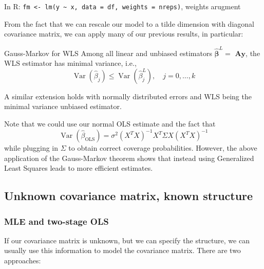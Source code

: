 \documentclass[11pt, %
	oneside, %
	english, %
	onehalfspacing, %
	]{article} %
\numberwithin{equation}{section}
\begin{document}
 In R: \lstinline|fm <- lm(y ~ x, data = df, weights = nreps)|, weights arugment

 From the fact that we can rescale our model to a tilde dimension with diagonal covariance matrix, we can apply many of our previous results, in particular:

\begin{proposition}{Gauss-Markov for WLS}{}
    Among all linear and unbiased estimators $\hat{\mathbf{\beta}}^L=$ $\mathbf{A} \mathbf{y}$, the WLS estimator has minimal variance, i.e.,
    $$
    \operatorname{Var}\left(\hat{\beta}_j\right) \leq \operatorname{Var}\left(\hat{\beta}_j^L\right), \quad j=0, \ldots, k
    $$
\end{proposition}

A similar extension holds with normally distributed errors and WLS being the minimal variance unbiased estimator.

Note that we could use our normal OLS estimate and the fact that
$$
\operatorname{Var}(\hat{\beta}_\text{OLS}) = \sigma^2 (X^T X)^{-1} X^T \Sigma X (X^T X)^{-1}
$$
while plugging in $\Sigma$ to obtain correct coverage probabilities. However, the above application of the Gauss-Markov theorem shows that instead using Generalized Least Squares leads to more efficient estimates.

 \subsection{Unknown covariance matrix, known structure}

 \subsubsection*{MLE and two-stage OLS}

If our covariance matrix is unknown, but we can specify the structure, we can usually use this information to model the covariance matrix. There are two approaches:
\end{document}
